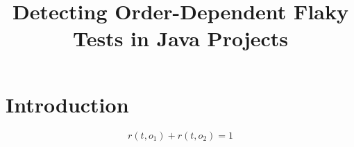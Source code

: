 \documentclass[10pt,conference]{IEEEtran}
\begin{document}
\title{Detecting Order-Dependent Flaky Tests in Java Projects}
\author{}
\maketitle
\section{Introduction}
\lipsum[1-2]
\begin{equation}
r(t, o_1) + r(t, o_2) = 1
\end{equation}
\lipsum[3-4]
\end{document}
